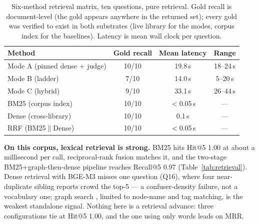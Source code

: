 \begin{table}[t]
\caption{Six-method retrieval matrix, ten questions, pure retrieval.
Gold recall is document-level (the gold appears anywhere in the returned
set); every gold was verified to exist in both substrates
(live library for the modes, corpus index for the baselines).
Latency is mean wall clock per question.}
\label{tab:e4-matrix}
\centering\footnotesize
\setlength{\tabcolsep}{4pt}
\begin{tabular}{@{}lccc@{}}
\toprule
Method & Gold recall & Mean latency & Range \\
\midrule
Mode A (pinned dense + judge) & 10/10 & 19.8\,s & 18--24\,s \\
Mode B (ladder)               & 7/10  & 14.0\,s & 5--20\,s \\
Mode C (hybrid)               & 9/10  & 33.1\,s & 26--44\,s \\
BM25 (corpus index)           & 10/10 & $<$0.05\,s & --- \\
Dense (cross-library)         & 10/10 & 0.1\,s  & --- \\
RRF (BM25$\|$Dense)           & 10/10 & $<$0.05\,s & --- \\
\bottomrule
\end{tabular}
\end{table}

\textbf{On this corpus, lexical retrieval is strong.} BM25 \cite{bm25}
hits Hit@5 1.00 at about a millisecond per call, reciprocal-rank fusion
\cite{rrf-cormack} matches it, and the two-stage BM25+graph-then-dense
pipeline reaches Recall@5 0.97 (Table~\ref{tab:retrieval}). Dense
retrieval with BGE-M3 \cite{bge-m3} misses one question (Q16), where four
near-duplicate sibling reports crowd the top-5 --- a confuser-density
failure, not a vocabulary one; graph search \cite{graphrag}, limited to
node-name and tag matching, is the weakest standalone signal. Nothing here
is a retrieval advance: three configurations tie at Hit@5 1.00, and the one
using only words leads on MRR.

